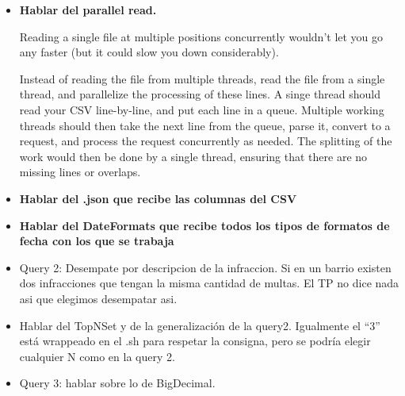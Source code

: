 \documentclass[a4paper,12pt]{article}
\begin{document}
	\begin{itemize}
		\item \textbf{Hablar del parallel read.}
		
		Reading a single file at multiple positions concurrently wouldn't let you go any faster (but it could slow you down considerably).
		
		Instead of reading the file from multiple threads, read the file from a single thread, and parallelize the processing of these lines. A singe thread should read your CSV line-by-line, and put each line in a queue. Multiple working threads should then take the next line from the queue, parse it, convert to a request, and process the request concurrently as needed. The splitting of the work would then be done by a single thread, ensuring that there are no missing lines or overlaps. 
		
		\item \textbf{Hablar del .json que recibe las columnas del CSV}
		
		\item \textbf{Hablar del DateFormats que recibe todos los tipos de formatos de fecha con los que se trabaja}
		
		\item Query 2: Desempate por descripcion de la infraccion. Si en un barrio existen dos infracciones que tengan la misma cantidad de multas. El TP no dice nada asi que elegimos desempatar asi. 
		
		\item Hablar del TopNSet y de la generalización de la query2. Igualmente el ``3'' está wrappeado en el .sh para respetar la consigna, pero se podría elegir cualquier N como en la query 2.
		
		\item Query 3: hablar sobre lo de BigDecimal.
	\end{itemize}
	
	
\end{document}
